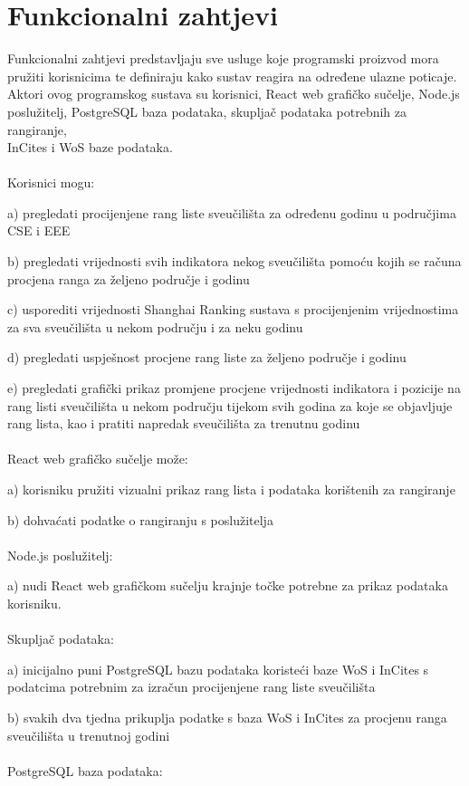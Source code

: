 \documentclass[times, utf8, zavrsni]{fer}
\begin{document}
\section{Funkcionalni zahtjevi}
Funkcionalni zahtjevi predstavljaju sve usluge koje programski proizvod mora pružiti korisnicima te definiraju kako sustav reagira na određene ulazne poticaje.
\\ Aktori ovog programskog sustava su korisnici, React web grafičko sučelje, Node.js poslužitelj, PostgreSQL baza podataka, skupljač podataka potrebnih za rangiranje, 
\\InCites i WoS baze podataka.
\\
\\Korisnici mogu:

a) pregledati procijenjene rang liste sveučilišta za određenu godinu u područjima CSE i EEE

b) pregledati vrijednosti svih indikatora nekog sveučilišta pomoću kojih se računa procjena ranga za željeno područje i godinu

c) usporediti vrijednosti Shanghai Ranking sustava s procijenjenim vrijednostima za sva sveučilišta u nekom području i za neku godinu

d) pregledati uspješnost procjene rang liste za željeno područje i godinu

e) pregledati grafički prikaz promjene procjene vrijednosti indikatora i pozicije na rang listi sveučilišta u nekom području tijekom svih godina 
za koje se objavljuje rang lista, kao i pratiti napredak sveučilišta za trenutnu godinu
\\
\\React web grafičko sučelje može:

a) korisniku pružiti vizualni prikaz rang lista i podataka korištenih za rangiranje

b) dohvaćati podatke o rangiranju s poslužitelja
\\
\\Node.js poslužitelj:

a) nudi React web grafičkom sučelju krajnje točke potrebne za prikaz podataka korisniku.
\\\\
Skupljač podataka:

a) inicijalno puni PostgreSQL bazu podataka koristeći baze WoS i InCites s \\podatcima potrebnim za izračun procijenjene rang liste sveučilišta

b) svakih dva tjedna prikuplja podatke s baza WoS i InCites za procjenu ranga sveučilišta u trenutnoj godini
\\
\\PostgreSQL baza podataka:
 
\end{document}
